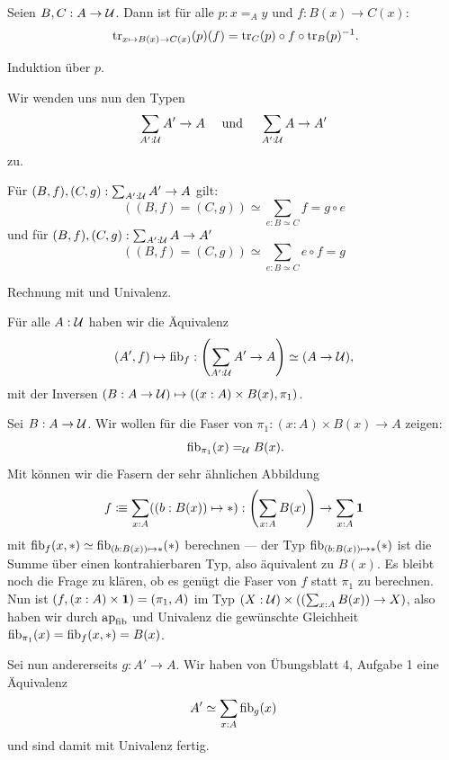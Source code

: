 \begin{lemma}
  \label{transport-in-funktionstypen}
  Seien $B,C:A\to\mathcal{U}$. Dann ist für alle $p:x=_Ay$ und $f:B(x)\to C(x)$:
  \[
    \transp_{x\mapsto B(x)\to C(x)}(p)(f)=\transp_C(p)\circ f \circ \transp_B(p)^{-1}\rlap{.}
  \]
\end{lemma}

\begin{beweis}
  Induktion über $p$.
\end{beweis}

Wir wenden uns nun den Typen
\[
  \sum_{A':\mathcal{U}}A'\to A\quad\text{ und }\quad\sum_{A':\mathcal{U}}A\to A'
  \]
  zu.

\begin{lemma}
  Für $(B,f),(C,g):\sum_{A':\mathcal{U}}A'\to A$ gilt:
  \[
    ((B,f)=(C,g)) \simeq \sum_{e:B\simeq C}f=g\circ e
  \]
  und für $(B,f),(C,g):\sum_{A^\prime:\mathcal{U}}A\to A^\prime$
  \[
    ((B,f)=(C,g))\simeq \sum_{e:B\simeq C}e\circ f=g
  \]
\end{lemma}

\begin{beweis}
  Rechnung mit  und Univalenz.
\end{beweis}

\begin{satz}[Objektklassifikation]
  \label{objektklassifikation}
  Für alle $A:\mathcal{U}$ haben wir die Äquivalenz
  \[
     (A',f)\mapsto \mathrm{fib}_f:\left(\sum_{A':\mathcal{U}}A'\to A\right)\simeq (A\to\mathcal{U}),
  \]
  mit der Inversen $(B:A\to\mathcal{U})\mapsto ((x:A)\times B(x), \pi_1)$.
\end{satz}

\begin{beweis}
  Sei $B:A\to\mathcal{U}$. Wir wollen für die Faser von $\pi_1:(x:A)\times B(x) \to A$ zeigen:
  \[
    \fib_{\pi_1}(x)=_\mU B(x)\rlap{.}
  \]
  Mit  können wir die Fasern der sehr ähnlichen Abbildung
  \[
    f\vcentcolon\mspace{-1.2mu}\equiv\sum_{x:A}((b:B(x))\mapsto \ast) : \left(\sum_{x:A}B(x)\right)\to \sum_{x:A}\mathbf{1}
    \]
    mit $\mathrm{fib}_f(x,\ast)\simeq \mathrm{fib}_{(b:B(x))\mapsto \ast}(\ast)$ berechnen --- der Typ $\mathrm{fib}_{(b:B(x))\mapsto \ast}(\ast)$ ist die Summe über einen kon\-tra\-hier\-ba\-ren Typ, also äquivalent zu $B(x)$.
    Es bleibt noch die Frage zu klären, ob es genügt die Faser von $f$ statt $\pi_1$ zu berechnen.
    Nun ist $(f,(x:A)\times\mathbf{1})=(\pi_1,A)$ im Typ $(X:\mathcal{U})\times (\left(\sum_{x:A}B(x)\right)\to X)$,
    also haben wir durch $\mathrm{ap}_{\mathrm{fib}}$ und Univalenz die gewünschte Gleichheit $\mathrm{fib}_{\pi_1}(x)=\mathrm{fib}_f(x,\ast)=B(x)$.

    Sei nun andererseits $g:A'\to A$. Wir haben von Übungsblatt 4, Aufgabe 1 eine Äquivalenz
    \[
      A'\simeq \sum_{x:A}\mathrm{fib}_g(x)
    \]
    und sind damit mit Univalenz fertig.
\end{beweis}

